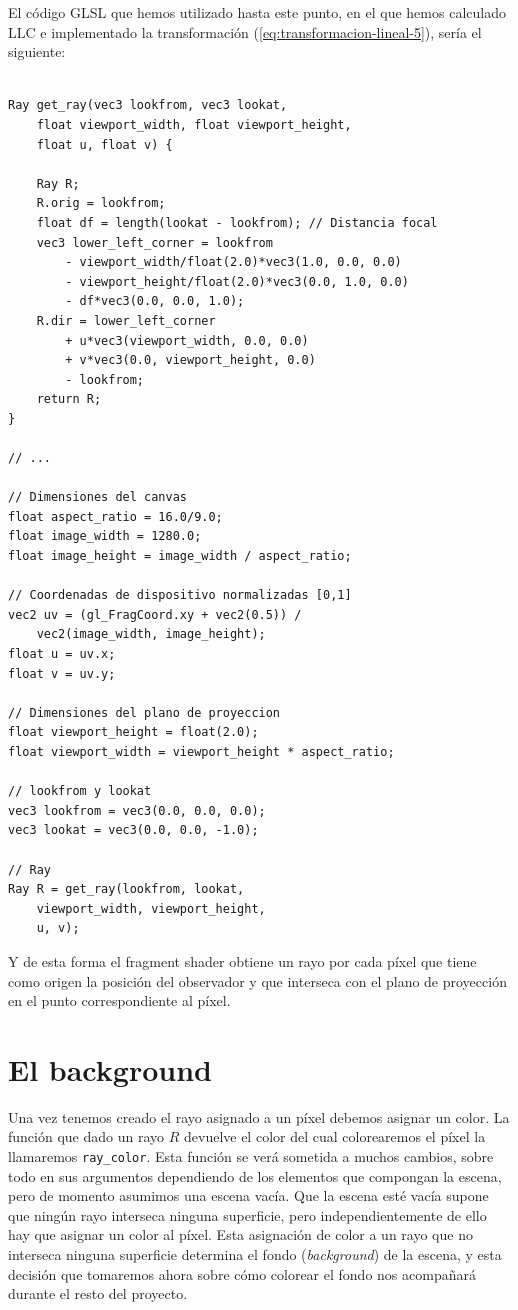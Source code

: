 El código GLSL que hemos utilizado hasta este punto, en el que hemos calculado $\mathrm{LLC}$ e implementado la transformación (\ref{eq:transformacion-lineal-5}), sería el siguiente:

\begin{lstlisting}

Ray get_ray(vec3 lookfrom, vec3 lookat, 
    float viewport_width, float viewport_height, 
    float u, float v) {
    
    Ray R;
    R.orig = lookfrom;
    float df = length(lookat - lookfrom); // Distancia focal
    vec3 lower_left_corner = lookfrom
        - viewport_width/float(2.0)*vec3(1.0, 0.0, 0.0)
        - viewport_height/float(2.0)*vec3(0.0, 1.0, 0.0) 
        - df*vec3(0.0, 0.0, 1.0);
    R.dir = lower_left_corner 
        + u*vec3(viewport_width, 0.0, 0.0)
        + v*vec3(0.0, viewport_height, 0.0) 
        - lookfrom;
    return R;
}

// ... 

// Dimensiones del canvas
float aspect_ratio = 16.0/9.0;
float image_width = 1280.0;
float image_height = image_width / aspect_ratio;

// Coordenadas de dispositivo normalizadas [0,1]
vec2 uv = (gl_FragCoord.xy + vec2(0.5)) / 
    vec2(image_width, image_height);
float u = uv.x;
float v = uv.y;

// Dimensiones del plano de proyeccion
float viewport_height = float(2.0);
float viewport_width = viewport_height * aspect_ratio;

// lookfrom y lookat
vec3 lookfrom = vec3(0.0, 0.0, 0.0);
vec3 lookat = vec3(0.0, 0.0, -1.0);

// Ray
Ray R = get_ray(lookfrom, lookat, 
    viewport_width, viewport_height, 
    u, v);
\end{lstlisting}

Y de esta forma el fragment shader obtiene un rayo por cada píxel que tiene como origen la posición del observador y que interseca con el plano de proyección en el punto correspondiente al píxel.

\section{El background}

Una vez tenemos creado el rayo asignado a un píxel debemos asignar un color. La función que dado un rayo $R$ devuelve el color del cual colorearemos el píxel la llamaremos \verb|ray_color|. Esta función se verá sometida a muchos cambios, sobre todo en sus argumentos dependiendo de los elementos que compongan la escena, pero de momento asumimos una escena vacía. Que la escena esté vacía supone que ningún rayo interseca ninguna superficie, pero independientemente de ello hay que asignar un color al píxel. Esta asignación de color a un rayo que no interseca ninguna superficie determina el fondo (\textit{background}) de la escena, y esta decisión que tomaremos ahora sobre cómo colorear el fondo nos acompañará durante el resto del proyecto. 

